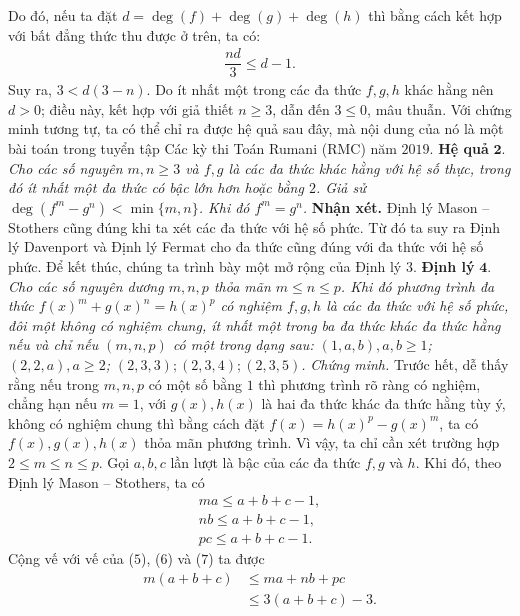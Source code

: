 \begin{multicols}{2}
	Do đó, nếu ta đặt $d=\deg(f) + \deg(g) + \deg(h)$ thì bằng cách kết hợp với bất đẳng thức thu được ở trên, ta có:
	\begin{align*}
		\dfrac{nd}{3} \le d - 1.
	\end{align*}
	Suy ra, $3 < d(3-n).$ Do ít nhất một trong các đa thức $f, g, h$ khác hằng nên $d >0$; điều này, kết hợp với giả thiết $n\ge 3$, dẫn đến $3\le 0$, mâu thuẫn. 
	\vskip 0.1cm
	Với chứng minh tương tự, ta có thể chỉ ra được hệ quả sau đây, mà nội dung của nó là một bài toán trong tuyển tập Các kỳ thi Toán Rumani (RMC) năm $2019$.
	\vskip 0.1cm
	\textbf{\color{hoccungpi}Hệ quả} $\pmb{2.}$ \textit{Cho các số nguyên $m,n\ge 3$ và $f,g$ là các đa thức khác hằng với hệ số thực, trong đó ít nhất một đa thức có bậc lớn hơn hoặc bằng $2$. Giả sử $\deg (f^m-g^n)<\min \{m,n\}$. Khi đó $f^m=g^n$.}
	\vskip 0.1cm
	\textbf{\color{hoccungpi}Nhận xét.}
	Định lý Mason -- Stothers cũng đúng khi ta xét các đa thức với hệ số phức. Từ đó ta suy ra Định lý Davenport và Định lý Fermat cho đa thức cũng đúng với đa thức với hệ số phức.
	\vskip 0.1cm
	Để kết thúc, chúng ta trình bày một mở rộng của Định lý $3$.
	\vskip 0.1cm
	\textbf{\color{hoccungpi}Định lý} $\pmb{4.}$ \textit{Cho các số nguyên dương $m,n,p$ thỏa mãn $m\leq n\leq p$. Khi đó phương trình đa thức $f(x)^m+g(x)^n=h(x)^p$ có nghiệm $f,g,h$ là các đa thức với hệ số phức, đôi một không có nghiệm chung, ít nhất một trong ba đa thức khác đa thức hằng nếu và chỉ nếu $(m,n,p)$ có một trong dạng sau: $(1,a,b), a,b\ge 1$; $(2,2,a), a\ge 2$; $(2,3,3); (2,3,4); (2,3,5)$.}
	\vskip 0.1cm
	\textit{Chứng minh.}
	Trước hết, dễ thấy rằng nếu trong $m, n, p$ có một số bằng $1$ thì phương trình rõ ràng có nghiệm, chẳng hạn nếu $m=1$, với $g(x),h(x)$ là hai đa thức khác đa thức hằng tùy ý, không có nghiệm chung thì bằng cách đặt $f(x)=h(x)^p-g(x)^m$, ta có $f(x), g(x), h(x)$ thỏa mãn phương trình.
	\vskip 0.1cm
	Vì vậy, ta chỉ cần xét trường hợp $ 2 \le m \le n \le p$. Gọi $a, b, c$ lần lượt là bậc của các đa thức $f, g$ và $h$. Khi đó, theo Định lý Mason -- Stothers, ta có
	\begin{align*}
		ma \le a + b + c - 1, \tag{$5$}\\
		nb \le a + b + c - 1, \tag{$6$}\\
		pc \le a + b + c - 1. \tag{$7$}
	\end{align*}
	Cộng vế với vế của ($5$), ($6$) và ($7$) ta được
	\begin{align*}
		m(a+ b + c) &\le ma + nb + pc \\
		&\le 3(a + b + c) - 3.
	\end{align*}

\end{multicols}
